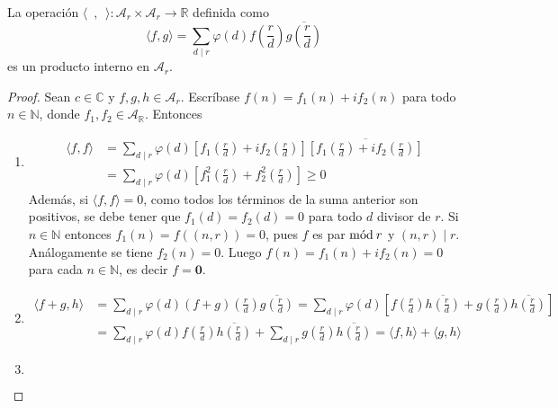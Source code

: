 \begin{proposition}
La operación $\langle \phantom{f},\phantom{g} \rangle : \mathcal{A}_r\times \mathcal{A}_r \longrightarrow \mathbb{R}$ definida como
\begin{equation*}
    \langle f,g \rangle = \sum_{d \mid r} \varphi(d) f \left( \frac{r}{d} \right) \overline{g \left( \frac{r}{d} \right)}
\end{equation*}
es un producto interno en $\mathcal{A}_r$.
\end{proposition}
\begin{proof}
Sean $c \in \mathbb{C}$ y $f,g,h \in \mathcal{A}_r$. Escríbase $f(n)=f_1(n)+ i f_2(n)$ para todo $n \in \mathbb{N}$, donde $f_1,f_2 \in \mathcal{A}_{\mathbb{R}}$. Entonces
\begin{enumerate}[label=\textnormal{(\roman*)}]
\item \begin{align*}
        \langle f,f \rangle & = \sum_{d \mid r} \varphi(d) \left[ f_1 \left( \frac{r}{d} \right) + i f_2 \left( \frac{r}{d} \right) \right] \overline{\left[ f_1 \left( \frac{r}{d} \right) + i f_2 \left( \frac{r}{d} \right) \right]} \\
                            & = \sum_{d \mid r} \varphi(d) \left[ f_1^2 \left( \frac{r}{d} \right) + f_2^2 \left( \frac{r}{d} \right) \right] \ge 0
\end{align*}
Además, si $\langle f,f \rangle=0$, como todos los términos de la suma anterior son positivos, se debe tener que $f_1(d)=f_2(d)=0$ para todo $d$ divisor de $r$. Si $n \in \mathbb{N}$ entonces $f_1(n)=f((n,r))=0$, pues $f$ es par $\mathrm{m\acute{o}d\:}r$ y $(n,r) \mid r$. Análogamente se tiene $f_2(n)=0$. Luego $f(n)=f_1(n)+i f_2(n)=0$ para cada $n \in \mathbb{N}$, es decir $f=\mathbf{0}$.
\item \begin{align*}
        \langle f+g,h \rangle & = \sum_{d \mid r} \varphi(d) (f+g) \left( \frac{r}{d} \right) \overline{g \left( \frac{r}{d} \right)} = \sum_{d \mid r} \varphi(d) \left[ f \left( \frac{r}{d} \right) \overline{h \left( \frac{r}{d} \right)} + g \left( \frac{r}{d} \right) \overline{h \left( \frac{r}{d} \right)} \right] \\
                              & = \sum_{d \mid r} \varphi(d) f \left( \frac{r}{d} \right) \overline{h \left( \frac{r}{d} \right)} + \sum_{d \mid r} g \left( \frac{r}{d} \right) \overline{h \left( \frac{r}{d} \right)} = \langle f,h \rangle + \langle g,h \rangle
\end{align*}
\item \begin{equation*}

\end{equation*}
\end{enumerate}
\end{proof}
